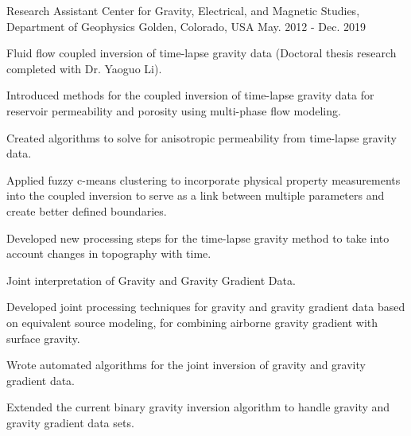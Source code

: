 \begin{cventries}
  \cventry
    {Research Assistant} %
    {Center for Gravity, Electrical, and Magnetic Studies, Department of Geophysics} %
    {Golden, Colorado, USA} %
    {May. 2012 - Dec. 2019} %
    {\begin{cvparagraph}
      Fluid flow coupled inversion of time-lapse gravity data (Doctoral thesis research completed with Dr. Yaoguo Li).
      \vspace{7pt}
      \end{cvparagraph}
      \begin{cvitems} %
        \item {Introduced methods for the coupled inversion of time-lapse gravity data for reservoir permeability and porosity using multi-phase flow modeling.}
        \item {Created algorithms to solve for anisotropic permeability from time-lapse gravity data.}
        \item {Applied fuzzy c-means clustering to incorporate physical property measurements into the coupled inversion to serve as a link between multiple parameters and create better defined boundaries.}
        \item {Developed new processing steps for the time-lapse gravity method to take into account changes in topography with time.}
        \vspace{10pt}
      \end{cvitems}
      \begin{cvparagraph}
      \vspace{7pt}
      Joint interpretation of Gravity and Gravity Gradient Data.
      \vspace{7pt}
      \end{cvparagraph}
      \begin{cvitems}
        \item {Developed joint processing techniques for gravity and gravity gradient data based on equivalent source modeling, for combining airborne gravity gradient with surface gravity.}
        \item {Wrote automated algorithms for the joint inversion of gravity and gravity gradient data.}
        \item {Extended the current binary gravity inversion algorithm to handle gravity and gravity gradient data sets.}
        \vspace{10pt}
      \end{cvitems}
      \begin{cvparagraph}

\end{cvparagraph}}
\end{cventries}
